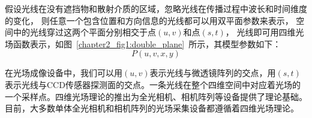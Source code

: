 假设光线在没有遮挡物和散射介质的区域，忽略光线在传播过程中波长和时间维度的变化，
则任意一个包含位置和方向信息的光线都可以用双平面参数来表示，
空间中的光线穿过这两个平面分别相交于点$(u, v)$和点$(s, t)$，
光线即可用四维光场函数表示，如图~\ref{chapter2_fig1:double_plane}~所示，其模型参数如下：
\begin{equation}
	P(u, v, x, y)
\end{equation}\par
在光场成像设备中，我们可以用$(u, v)$表示光线与微透镜阵列的交点，用$(s, t)$表示光线与CCD传感器探测面的交点。一条光线在整个四维空间中对应着光场的一个采样点。四维光场理论的推出为全光相机、相机阵列等设备提供了理论基础。目前，大多数单体全光相机和相机阵列的光场采集设备都遵循着四维光场理论。
%
%


